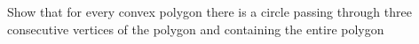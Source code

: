 Show that for every convex polygon there is a circle passing through three consecutive vertices of the polygon and containing the entire polygon